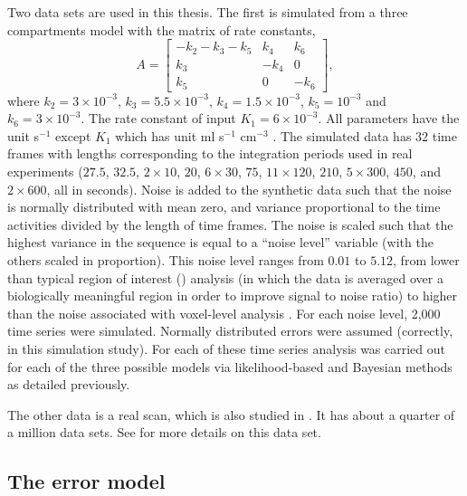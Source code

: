 Two data sets are used in this thesis. The first is simulated from a
three compartments model with the matrix of rate constants,
\begin{equation}
  A = \begin{bmatrix}
    - k_2 - k_3 - k_5 & k_4  & k_6 \\
    k_3               & -k_4 & 0   \\
    k_5               & 0    & -k_6
  \end{bmatrix},
\end{equation}
where $k_2 = 3 \times 10^{-3}$, $k_3 = 5.5 \times 10^{-3}$, $k_4 = 1.5 \times
10^{-3}$, $k_5 = 10^{-3}$ and $k_6 = 3 \times 10^{-3}$. The rate constant of
input $K_1 = 6\times 10^{-3}$. All parameters have the unit s$^{-1}$ except
$K_1$ which has unit ml s$^{-1}$ cm$^{-3}$ \cite{RLNomen}. The simulated data
has 32 time frames with lengths corresponding to the integration periods used
in real experiments ($27.5$, $32.5$, $2 \times 10$, $20$, $6 \times 30$, $75$,
$11 \times 120$, $210$, $5 \times 300$, $450$, and $2 \times 600$, all in
seconds).  Noise is added to the synthetic data such that the noise is
normally distributed with mean zero, and variance proportional to the time
activities divided by the length of time frames. The noise is scaled such that
the highest variance in the sequence is equal to a ``noise level'' variable
(with the others scaled in proportion).  This noise level ranges from $0.01$
to $5.12$, from lower than typical region of interest (\roi) analysis (in
which the data is averaged over a biologically meaningful region in order to
improve signal to noise ratio) to higher than the noise associated with
voxel-level analysis \citep{Peng:2008fx}.  For each noise level, 2,000 time
series were simulated.  Normally distributed errors were assumed (correctly,
in this simulation study). For each of these time series analysis was carried
out for each of the three possible models via likelihood-based and Bayesian
methods as detailed previously.

The other data is a real \pet scan, which is also studied in
\cite{Peng:2008fx}.  It has about a quarter of a million data sets. See
\cite{Zhou2013} for more details on this data set.

\subsection{The error model}
\label{sub:The error model}


